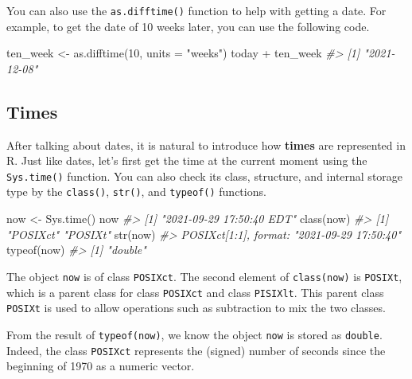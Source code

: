 \documentclass[
]{book}
\newenvironment{Shaded}{\begin{snugshade}}{\end{snugshade}}
\newcommand{\AttributeTok}[1]{\textcolor[rgb]{0.77,0.63,0.00}{#1}}
\newcommand{\CommentTok}[1]{\textcolor[rgb]{0.56,0.35,0.01}{\textit{#1}}}
\newcommand{\DecValTok}[1]{\textcolor[rgb]{0.00,0.00,0.81}{#1}}
\newcommand{\FunctionTok}[1]{\textcolor[rgb]{0.00,0.00,0.00}{#1}}
\newcommand{\NormalTok}[1]{#1}
\newcommand{\OtherTok}[1]{\textcolor[rgb]{0.56,0.35,0.01}{#1}}
\newcommand{\SpecialCharTok}[1]{\textcolor[rgb]{0.00,0.00,0.00}{#1}}
\newcommand{\StringTok}[1]{\textcolor[rgb]{0.31,0.60,0.02}{#1}}
\begin{document}
You can also use the \texttt{as.difftime()} function to help with getting a date. For example, to get the date of 10 weeks later, you can use the following code.

\begin{Shaded}
\begin{Highlighting}[]
\NormalTok{ten\_week }\OtherTok{\textless{}{-}} \FunctionTok{as.difftime}\NormalTok{(}\DecValTok{10}\NormalTok{, }\AttributeTok{units =} \StringTok{"weeks"}\NormalTok{)}
\NormalTok{today }\SpecialCharTok{+}\NormalTok{ ten\_week}
\CommentTok{\#\textgreater{} [1] "2021{-}12{-}08"}
\end{Highlighting}
\end{Shaded}

\hypertarget{times}{%
\subsection{Times}\label{times}}

After talking about dates, it is natural to introduce how \textbf{times} are represented in R. Just like dates, let's first get the time at the current moment using the \texttt{Sys.time()} function. You can also check its class, structure, and internal storage type by the \texttt{class()}, \texttt{str()}, and \texttt{typeof()} functions.

\begin{Shaded}
\begin{Highlighting}[]
\NormalTok{now }\OtherTok{\textless{}{-}} \FunctionTok{Sys.time}\NormalTok{()}
\NormalTok{now}
\CommentTok{\#\textgreater{} [1] "2021{-}09{-}29 17:50:40 EDT"}
\FunctionTok{class}\NormalTok{(now)}
\CommentTok{\#\textgreater{} [1] "POSIXct" "POSIXt"}
\FunctionTok{str}\NormalTok{(now)}
\CommentTok{\#\textgreater{}  POSIXct[1:1], format: "2021{-}09{-}29 17:50:40"}
\FunctionTok{typeof}\NormalTok{(now)}
\CommentTok{\#\textgreater{} [1] "double"}
\end{Highlighting}
\end{Shaded}

The object \texttt{now} is of class \texttt{POSIXct}. The second element of \texttt{class(now)} is \texttt{POSIXt}, which is a parent class for class \texttt{POSIXct} and class \texttt{PISIXlt}. This parent class \texttt{POSIXt} is used to allow operations such as subtraction to mix the two classes.

From the result of \texttt{typeof(now)}, we know the object \texttt{now} is stored as \texttt{double}. Indeed, the class \texttt{POSIXct} represents the (signed) number of seconds since the beginning of 1970 as a numeric vector.
\end{document}
